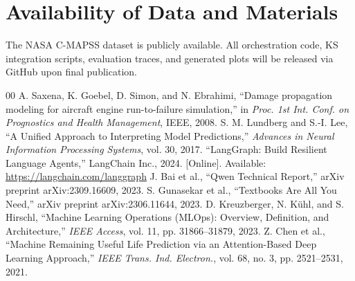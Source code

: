 \documentclass[conference, 10pt]{IEEEtran}
\begin{document}
\section*{Availability of Data and Materials}
The NASA C-MAPSS dataset is publicly available. All orchestration code, KS integration scripts, evaluation traces, and generated plots will be released via GitHub upon final publication.

\begin{thebibliography}{00}
 A. Saxena, K. Goebel, D. Simon, and N. Ebrahimi, ``Damage propagation modeling for aircraft engine run-to-failure simulation,'' in \textit{Proc. 1st Int. Conf. on Prognostics and Health Management}, IEEE, 2008.
 S. M. Lundberg and S.-I. Lee, ``A Unified Approach to Interpreting Model Predictions,'' \textit{Advances in Neural Information Processing Systems}, vol. 30, 2017.
 ``LangGraph: Build Resilient Language Agents,'' LangChain Inc., 2024. [Online]. Available: \url{https://langchain.com/langgraph}
 J. Bai et al., ``Qwen Technical Report,'' arXiv preprint arXiv:2309.16609, 2023.
 S. Gunasekar et al., ``Textbooks Are All You Need,'' arXiv preprint arXiv:2306.11644, 2023.
 D. Kreuzberger, N. K\"{u}hl, and S. Hirschl, ``Machine Learning Operations (MLOps): Overview, Definition, and Architecture,'' \textit{IEEE Access}, vol. 11, pp. 31866--31879, 2023.
 Z. Chen et al., ``Machine Remaining Useful Life Prediction via an Attention-Based Deep Learning Approach,'' \textit{IEEE Trans. Ind. Electron.}, vol. 68, no. 3, pp. 2521--2531, 2021.
\end{thebibliography}
\end{document}
